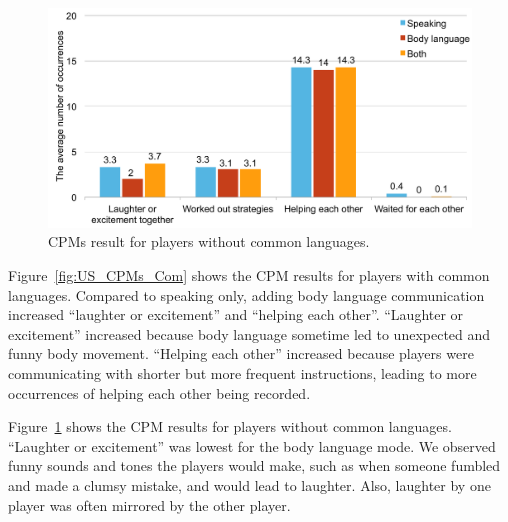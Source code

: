 \begin{figure}[!h]
\centering
\includegraphics[width=0.9\columnwidth]{Figures/US_CPMs_Dif.pdf}
\caption{CPMs result for players without common languages.}
\label{fig:US_CPMs_Dif}
\end{figure}

Figure~\ref{fig:US_CPMs_Com} shows the CPM results for players with common languages. Compared to speaking only, adding body language communication increased ``laughter or excitement'' and ``helping each other''. ``Laughter or excitement'' increased because body language sometime led to unexpected and funny body movement. ``Helping each other'' increased because players were communicating with shorter but more frequent instructions, leading to more occurrences of helping each other being recorded. 

Figure~\ref{fig:US_CPMs_Dif} shows the CPM results for players without common languages. 
``Laughter or excitement'' was lowest for the body language mode.  We observed funny sounds and tones the players would make, such as when someone fumbled and made a clumsy mistake, and would lead to laughter. Also, laughter by one player was often mirrored by the other player. 


 

